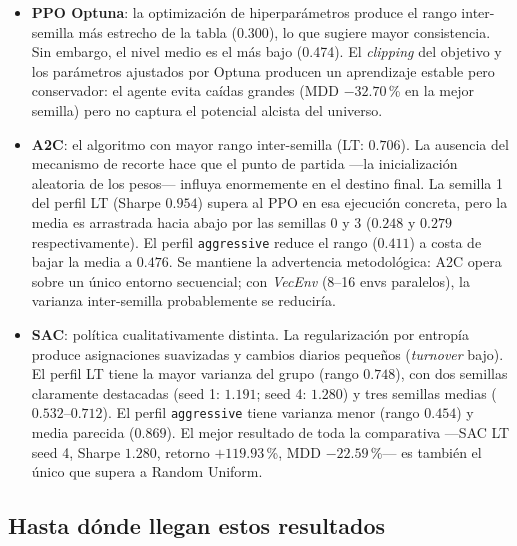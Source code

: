 \documentclass[IB,a4paper]{TFUOC}
\begin{document}
\begin{itemize}
    \item \textbf{PPO Optuna}: la optimización de hiperparámetros produce el rango inter-semilla más estrecho de la tabla ($0.300$), lo que sugiere mayor consistencia. Sin embargo, el nivel medio es el más bajo (0.474). El \textit{clipping} del objetivo y los parámetros ajustados por Optuna producen un aprendizaje estable pero conservador: el agente evita caídas grandes (MDD $-32.70$\,\% en la mejor semilla) pero no captura el potencial alcista del universo.

    \item \textbf{A2C}: el algoritmo con mayor rango inter-semilla (LT: $0.706$). La ausencia del mecanismo de recorte hace que el punto de partida —la inicialización aleatoria de los pesos— influya enormemente en el destino final. La semilla 1 del perfil LT (Sharpe $0.954$) supera al PPO en esa ejecución concreta, pero la media es arrastrada hacia abajo por las semillas 0 y 3 ($0.248$ y $0.279$ respectivamente). El perfil \texttt{aggressive} reduce el rango ($0.411$) a costa de bajar la media a $0.476$. Se mantiene la advertencia metodológica: A2C opera sobre un único entorno secuencial; con \textit{VecEnv} (8--16 envs paralelos), la varianza inter-semilla probablemente se reduciría.

    \item \textbf{SAC}: política cualitativamente distinta. La regularización por entropía produce asignaciones suavizadas y cambios diarios pequeños (\textit{turnover} bajo). El perfil LT tiene la mayor varianza del grupo (rango $0.748$), con dos semillas claramente destacadas (seed 1: $1.191$; seed 4: $1.280$) y tres semillas medias ($0.532$--$0.712$). El perfil \texttt{aggressive} tiene varianza menor (rango $0.454$) y media parecida ($0.869$). El mejor resultado de toda la comparativa —SAC LT seed 4, Sharpe $1.280$, retorno $+119.93$\,\%, MDD $-22.59$\,\%— es también el único que supera a Random Uniform.
\end{itemize}

\subsection{Hasta dónde llegan estos resultados}
\end{document}
